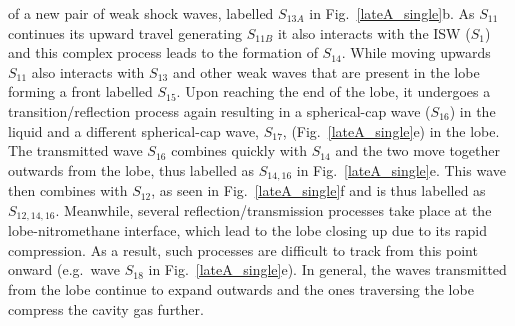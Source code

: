 \documentclass[3p,times,twocolumn]{elsarticle}
\begin{document}
of a new pair of weak shock waves, labelled  $S_{13A}$ in Fig.\ \ref{lateA_single}b. As $S_{11}$ continues its upward travel generating $S_{11B}$ it also interacts with the ISW ($S_1$) and this complex process leads to the formation of $S_{14}$. While moving upwards $S_{11}$ also interacts with $S_{13}$ and other weak waves that are present in the lobe forming a front labelled  $S_{15}$. Upon reaching the end of the lobe, it undergoes a transition/reflection process again resulting in a spherical-cap wave ($S_{16}$) in the liquid and a different spherical-cap wave, $S_{17}$,
(Fig.\  \ref{lateA_single}e) in the lobe. The transmitted wave $S_{16}$ 
combines quickly with $S_{14}$ and the two move together outwards from
the lobe, thus labelled as $S_{14,16}$ in Fig.\  \ref{lateA_single}e. This wave then combines
with $S_{12}$, as seen in  Fig.\  \ref{lateA_single}f and is thus labelled as $S_{12,14,16}$. Meanwhile, several
reflection/transmission processes take place at the lobe-nitromethane interface,
which lead to the lobe closing up due to its rapid compression. As a result,
such processes  are difficult to    track from this point
onward  (e.g.\ wave $S_{18}$ in Fig.\  \ref{lateA_single}e). In general,
the waves transmitted from the lobe continue to expand outwards and the ones
traversing the lobe compress the cavity gas further.
\end{document}
